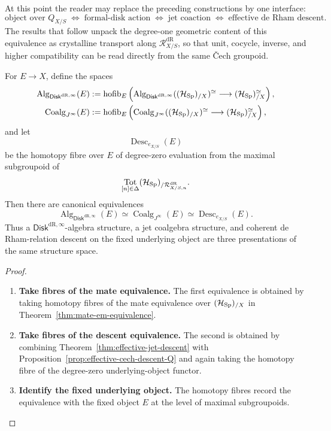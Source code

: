 At this point the reader may replace the preceding constructions by one
interface:
\[
  \boxed{
  \text{object over }Q_{X/S}
  \;\Longleftrightarrow\;
  \text{formal-disk action}
  \;\Longleftrightarrow\;
  \text{jet coaction}
  \;\Longleftrightarrow\;
  \text{effective de Rham descent}.
  }
\]
The results that follow unpack the degree-one geometric content of this
equivalence as crystalline transport along \(\mathcal R^{\mathrm{dR}}_{X/S}\),
so that unit, cocycle, inverse, and higher compatibility can be read directly
from the same \v{C}ech groupoid.
\begin{theorem}
\label{thm:transport-equivalence}
For \(E\to X\), define the spaces
\[
\begin{aligned}
  \operatorname{Alg}_{\mathsf{Disk}^{\mathrm{dR},\infty}}(E)
  &:=
  \operatorname{hofib}_{E}
  \left(
    \operatorname{Alg}_{\mathsf{Disk}^{\mathrm{dR},\infty}}((\mathcal H_{\operatorname{Sp}})_{/X})^\simeq
    \longrightarrow
    (\mathcal H_{\operatorname{Sp}})_{/X}^\simeq
  \right),\\
  \operatorname{Coalg}_{J^\infty}(E)
  &:=
  \operatorname{hofib}_{E}
  \left(
    \operatorname{Coalg}_{J^\infty}((\mathcal H_{\operatorname{Sp}})_{/X})^\simeq
    \longrightarrow
    (\mathcal H_{\operatorname{Sp}})_{/X}^\simeq
  \right),
\end{aligned}
\]
and let
\[
  \operatorname{Desc}_{e_{X/S}}(E)
\]
be the homotopy fibre over \(E\) of degree-zero evaluation from the maximal
subgroupoid of
\[
  \operatorname*{Tot}_{[n]\in\Delta}
  (\mathcal H_{\operatorname{Sp}})_{/\mathcal R^{\mathrm{dR}}_{X/S,n}}.
\]
Then there are canonical equivalences
\[
  \operatorname{Alg}_{\mathsf{Disk}^{\mathrm{dR},\infty}}(E)
  \simeq
  \operatorname{Coalg}_{J^\infty}(E)
  \simeq
  \operatorname{Desc}_{e_{X/S}}(E).
\]
Thus a \(\mathsf{Disk}^{\mathrm{dR},\infty}\)-algebra structure, a jet coalgebra structure, and coherent
de Rham-relation descent on the fixed underlying object are three
presentations of the same structure space.
\end{theorem}

\begin{proof}
\leavevmode
\begin{enumerate}[label=\textup{(\arabic*)}]
    \item \textbf{Take fibres of the mate equivalence.}
The first equivalence is obtained by taking homotopy fibres of the mate
equivalence over \((\mathcal H_{\operatorname{Sp}})_{/X}\) in
Theorem~\ref{thm:mate-em-equivalence}.

    \item \textbf{Take fibres of the descent equivalence.}
The second is obtained by combining
Theorem~\ref{thm:effective-jet-descent} with
Proposition~\ref{prop:effective-cech-descent-Q} and again taking the homotopy
fibre of the degree-zero underlying-object functor.

    \item \textbf{Identify the fixed underlying object.}
The homotopy fibres record the equivalence with the fixed object \(E\) at
the level of maximal subgroupoids.
\end{enumerate}
\end{proof}

